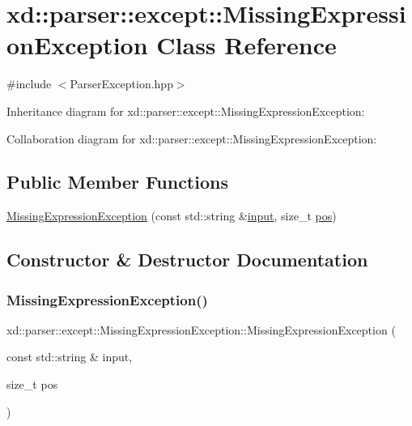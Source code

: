 \hypertarget{classxd_1_1parser_1_1except_1_1_missing_expression_exception}{}\section{xd\+:\+:parser\+:\+:except\+:\+:Missing\+Expression\+Exception Class Reference}
\label{classxd_1_1parser_1_1except_1_1_missing_expression_exception}


{\ttfamily \#include $<$Parser\+Exception.\+hpp$>$}



Inheritance diagram for xd\+:\+:parser\+:\+:except\+:\+:Missing\+Expression\+Exception\+:


Collaboration diagram for xd\+:\+:parser\+:\+:except\+:\+:Missing\+Expression\+Exception\+:
\subsection*{Public Member Functions}
\begin{DoxyCompactItemize}
\item 
\mbox{\hyperlink{classxd_1_1parser_1_1except_1_1_missing_expression_exception_aace70475e012e6c5ca96ff0675899d9f}{Missing\+Expression\+Exception}} (const std\+::string \&\mbox{\hyperlink{classxd_1_1parser_1_1except_1_1_parser_exception_a6fde0ecef06df6bc2bcaef504269acea}{input}}, size\+\_\+t \mbox{\hyperlink{classxd_1_1parser_1_1except_1_1_parser_exception_ab58b07ce51aef576df0cfe45f0c7e222}{pos}})
\end{DoxyCompactItemize}


\subsection{Constructor \& Destructor Documentation}
\mbox{\label{classxd_1_1parser_1_1except_1_1_missing_expression_exception_aace70475e012e6c5ca96ff0675899d9f}} 
\subsubsection{\texorpdfstring{Missing\+Expression\+Exception()}{MissingExpressionException()}}
{\footnotesize\ttfamily xd\+::parser\+::except\+::\+Missing\+Expression\+Exception\+::\+Missing\+Expression\+Exception (\begin{DoxyParamCaption}\item[{const std\+::string \&}]{input,  }\item[{size\+\_\+t}]{pos }\end{DoxyParamCaption})\hspace{0.3cm}{\ttfamily [inline]}}



